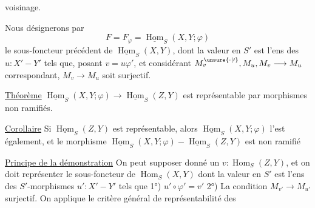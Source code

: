 voisinage.

Nous désignerons par
\[
F=F_\varphi=\underline{\operatorname{Hom}}_S(X,Y;\varphi)
\]
le sous-foncteur précédent de $\underline{\operatorname{Hom}}_S(X,Y)$, dont la valeur en $S'$ est l'ens des  $u:X'-Y'$ tels que, posant $v=u\varphi'$, et considérant $M_v^{\unsure{\cdot|\prime}},M_u,M_v\longrightarrow M_u$ correspondant, $M_v\longrightarrow M_u$ soit surjectif.

\uline{Théorème} $\underline{\operatorname{Hom}}_S(X,Y;\varphi)\longrightarrow\underline{\operatorname{Hom}}_S(Z,Y)$ est représentable par morphismes non ramifiés.

\uline{Corollaire} Si $\underline{\operatorname{Hom}}_S(Z,Y)$ est représentable, alors $\underline{\operatorname{Hom}}_S(X,Y;\varphi)$ l'est également, et le morphisme $\underline{\operatorname{Hom}}_S(X,Y;\varphi)-\underline{\operatorname{Hom}}_S(Z,Y)$ est non ramifié

\uline{Principe de la démonstration} On peut supposer donné un $v:\operatorname{Hom}_S(Z,Y)$, et on doit représenter le sous-foncteur de $\operatorname{Hom}_S(X,Y)$ dont la valeur en $S'$ est l'ens des $S'$-morphismes $u':X'-Y'$ tels que 1°) $u'\circ\varphi'=v'$ 2°) La condition $M_{v'}\longrightarrow M_{u'}$ surjectif. On applique le critère général de représentabilité  des 
